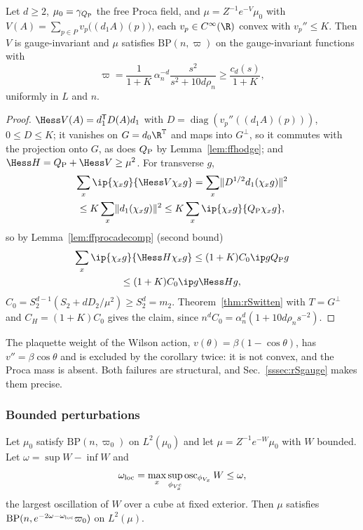 \begin{corollary}
\label{cor:rSplaquette}
Let $d\ge2$, $\mu_0=\gamma_{Q_{\rm P}}$ the free Proca field, and $\mu=Z^{-1}
e^{-V}\mu_0$ with $V(A)=\sum_{p\in P}v_p\bigl((d_1A)(p)\bigr)$, each $v_p\in
C^\infty(\R)$ convex with $v_p''\le K$. Then $V$ is gauge-invariant and $\mu$
satisfies $\mathrm{BP}(n,\varpi)$ on the gauge-invariant functions with
\[
\varpi=\frac1{1+K}\,\alpha_n^{-d}\frac{s^2}{s^2+10d\rho_n}\ge\frac{c_d(s)}{1+K},
\]
uniformly in $L$ and $n$.
\end{corollary}

\begin{proof}
$\Hess V(A)=d_1^{\mathsf T}D(A)d_1$ with $D=\operatorname{diag}(v_p''((d_1A)(p)))$,
$0\le D\le K$; it vanishes on $G=d_0\R^{\mathbb T}$ and maps into $G^\perp$,
so it commutes with the projection onto $G$, as does $Q_{\rm P}$ by
Lemma~\ref{lem:ffhodge}; and $\Hess H=Q_{\rm P}+\Hess V\ge\mu^2$. For
transverse $g$,
\begin{multline*}
\sum_x\ip{\chi_xg}{\Hess V\chi_xg}=\sum_x\lVert D^{1/2}d_1(\chi_xg)\rVert^2\\
\le K\sum_x\lVert d_1(\chi_xg)\rVert^2\le K\sum_x\ip{\chi_xg}{Q_{\rm P}\chi_xg},
\end{multline*}
so by Lemma~\ref{lem:ffprocadecomp} (second bound)
\begin{multline*}
\sum_x\ip{\chi_xg}{\Hess H\chi_xg}\le(1+K)C_0\ip g{Q_{\rm P}g}\\
\le(1+K)C_0\ip g{\Hess Hg},
\end{multline*}
$C_0=S_2^{d-1}(S_2+dD_2/\mu^2)\ge S_2^d=m_2$. Theorem~\ref{thm:rSwitten}
with $T=G^\perp$ and $C_H=(1+K)C_0$ gives the claim, since $n^dC_0=
\alpha_n^d(1+10d\rho_ns^{-2})$.
\end{proof}

The plaquette weight of the Wilson action, $v(\theta)=\beta(1-\cos\theta)$,
has $v''=\beta\cos\theta$ and is excluded by the corollary twice: it is not
convex, and the Proca mass is absent. Both failures are structural, and
Sec.~\ref{sssec:rSgauge} makes them precise.

\subsubsection{Bounded perturbations}\label{sssec:rSbounded}

\begin{proposition}\label{prop:rSglobalHS}
Let $\mu_0$ satisfy $\mathrm{BP}(n,\varpi_0)$ on $L^2(\mu_0)$ and let $\mu=
Z^{-1}e^{-W}\mu_0$ with $W$ bounded. Let $\omega=\sup W-\inf W$ and
\[
\omega_{\rm loc}=\max_x\sup_{\phi_{V_x^c}}\operatorname{osc}_{\phi_{V_x}}W
\le\omega,
\]
the largest oscillation of $W$ over a cube at fixed exterior. Then $\mu$
satisfies $\mathrm{BP}(n,e^{-2\omega-\omega_{\rm loc}}\varpi_0)$ on
$L^2(\mu)$.
\end{proposition}

